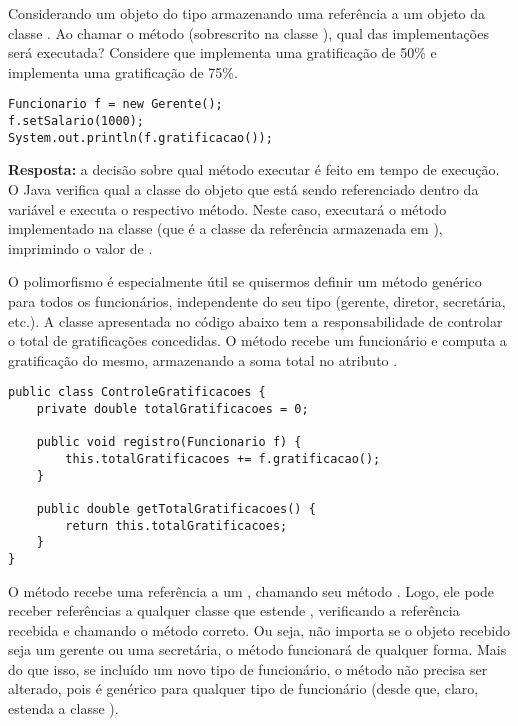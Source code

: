 Considerando um objeto do tipo  armazenando uma referência a um objeto da classe . Ao chamar o método  (sobrescrito na classe ), qual das implementações será executada? Considere que  implementa uma gratificação de 50\% e  implementa uma gratificação de 75\%.

\begin{verbatim}
Funcionario f = new Gerente();
f.setSalario(1000);
System.out.println(f.gratificacao());
\end{verbatim}

\textbf{Resposta: } a decisão sobre qual método executar é feito em tempo de execução. O Java verifica qual a classe do objeto que está sendo referenciado dentro da variável e executa o respectivo método. Neste caso, executará o método implementado na classe  (que é a classe da referência armazenada em ), imprimindo o valor de .

O polimorfismo é especialmente útil se quisermos definir um método genérico para todos os funcionários, independente do seu tipo (gerente, diretor, secretária, etc.). A classe apresentada no código abaixo tem a responsabilidade de controlar o total de gratificações concedidas. O método  recebe um funcionário e computa a gratificação do mesmo, armazenando a soma total no atributo .

\begin{verbatim}
public class ControleGratificacoes {
	private double totalGratificacoes = 0;

	public void registro(Funcionario f) {
		this.totalGratificacoes += f.gratificacao();
	}

	public double getTotalGratificacoes() {
		return this.totalGratificacoes;
	}
}
\end{verbatim}

O método  recebe uma referência a um , chamando seu método . Logo, ele pode receber referências a qualquer classe que estende , verificando a referência recebida e chamando o método correto. Ou seja, não importa se o objeto recebido seja um gerente ou uma secretária, o método funcionará de qualquer forma. Mais do que isso, se incluído um novo tipo de funcionário, o método  não precisa ser alterado, pois é genérico para qualquer tipo de funcionário (desde que, claro, estenda a classe ).


